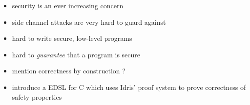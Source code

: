 \begin{itemize}
	\item security is an ever increasing concern
	\item side channel attacks are very hard to guard against
	\item hard to write secure, low-level programs
	\item hard to \textit{guarantee} that a program is secure
	\item mention correctness by construction \cite{Chapman:2006:CCM:1151816.1151820}?
	\item introduce a EDSL for C which uses Idris' proof system to prove
		  correctness of safety properties
\end{itemize}